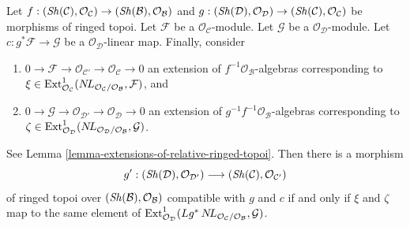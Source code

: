 \begin{lemma}
\label{lemma-extensions-of-relative-ringed-topoi-functorial}
Let $f : (\mathop{\mathit{Sh}}\nolimits(\mathcal{C}), \mathcal{O}_\mathcal{C}) \to
(\mathop{\mathit{Sh}}\nolimits(\mathcal{B}), \mathcal{O}_\mathcal{B})$ and
$g : (\mathop{\mathit{Sh}}\nolimits(\mathcal{D}), \mathcal{O}_\mathcal{D}) \to
(\mathop{\mathit{Sh}}\nolimits(\mathcal{C}), \mathcal{O}_\mathcal{C})$ be morphisms
of ringed topoi. Let $\mathcal{F}$ be a $\mathcal{O}_\mathcal{C}$-module.
Let $\mathcal{G}$ be a $\mathcal{O}_\mathcal{D}$-module. Let
$c : g^*\mathcal{F} \to \mathcal{G}$ be a $\mathcal{O}_\mathcal{D}$-linear
map. Finally, consider
\begin{enumerate}
\item[(a)]
$0 \to \mathcal{F} \to \mathcal{O}_{\mathcal{C}'} \to
\mathcal{O}_\mathcal{C} \to 0$
an extension of $f^{-1}\mathcal{O}_\mathcal{B}$-algebras
corresponding to
$\xi \in \mathop{\mathrm{Ext}}\nolimits^1_{\mathcal{O}_\mathcal{C}}(
\mathop{N\!L}\nolimits_{\mathcal{O}_\mathcal{C}/\mathcal{O}_\mathcal{B}}, \mathcal{F})$, and
\item[(b)]
$0 \to \mathcal{G} \to \mathcal{O}_{\mathcal{D}'} \to
\mathcal{O}_\mathcal{D} \to 0$
an extension of $g^{-1}f^{-1}\mathcal{O}_\mathcal{B}$-algebras
corresponding to
$\zeta \in \mathop{\mathrm{Ext}}\nolimits^1_{\mathcal{O}_\mathcal{D}}(
\mathop{N\!L}\nolimits_{\mathcal{O}_\mathcal{D}/\mathcal{O}_\mathcal{B}}, \mathcal{G})$.
\end{enumerate}
See Lemma \ref{lemma-extensions-of-relative-ringed-topoi}.
Then there is a morphism
$$
g' :
(\mathop{\mathit{Sh}}\nolimits(\mathcal{D}), \mathcal{O}_{\mathcal{D}'})
\longrightarrow
(\mathop{\mathit{Sh}}\nolimits(\mathcal{C}), \mathcal{O}_{\mathcal{C}'})
$$
of ringed topoi over $(\mathop{\mathit{Sh}}\nolimits(\mathcal{B}), \mathcal{O}_\mathcal{B})$
compatible with $g$ and $c$ if and only if $\xi$ and $\zeta$
map to the same element of
$\mathop{\mathrm{Ext}}\nolimits^1_{\mathcal{O}_\mathcal{D}}(
Lg^*\mathop{N\!L}\nolimits_{\mathcal{O}_\mathcal{C}/\mathcal{O}_\mathcal{B}}, \mathcal{G})$.
\end{lemma}

